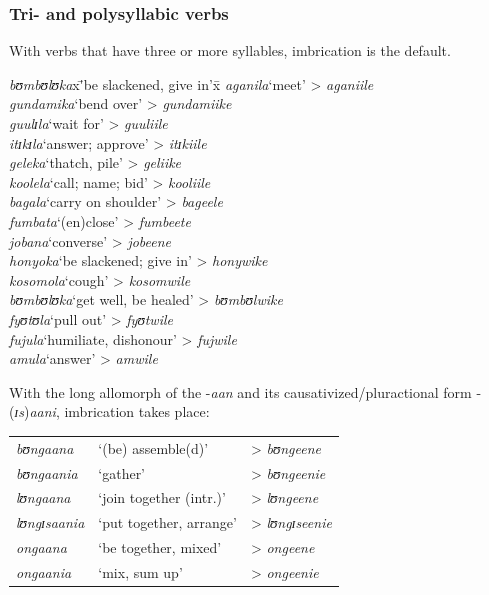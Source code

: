 \subsubsection{Tri- and polysyllabic verbs}
With verbs that have three or more syllables, imbrication is the default. %
\begin{exe}
\ex%
\begin{tabbing}
\textit{bʊmbʊlʊka}x\='be slackened, give in'x\=\kill%
\textit{aganila}\>`meet'\> > \textit{aganiile} \\
\textit{gundamika}\>`bend over'\> > \textit{gundamiike}\\
\textit{guulɪla}\>`wait for'\> > \textit{guuliile}\\
\textit{itɪkɪla}\>`answer; approve'\> > \textit{itɪkiile}\\ 
\textit{geleka}\>`thatch, pile'\> > \textit{geliike}\\
\textit{koolela}\>`call; name; bid'\> > \textit{kooliile} \\
\textit{bagala}\>`carry on shoulder'\> > \textit{bageele} \\
\textit{fumbata}\>`(en)close'\> > \textit{fumbeete}\\
\textit{jobana}\>`converse'\> > \textit{jobeene}\\
\textit{honyoka}\>`be slackened; give in'\> > \textit{honywike}\\
\textit{kosomola}\>`cough'\> > \textit{kosomwile}\\
\textit{bʊmbʊlʊka}\>`get well, be healed'\> > \textit{bʊmbʊlwike}\\
\textit{fyʊtʊla}\>`pull out'\> > \textit{fyʊtwile}\\
\textit{fujula}\>`humiliate, dishonour'\> > \textit{fujwile}\\
\textit{amula}\>`answer'\> > \textit{amwile}
\end{tabbing}
\end{exe}

With the long allomorph of the  -\textit{aan} and its causativized/plur\-action\-al form \mbox{-(\textit{ɪs})\textit{aani}}, imbrication takes place:

\begin{exe}
\ex
\begin{tabular}[t]{@{}>{\itshape}lll}
\textit{bʊngaana}&`(be) assemble(d)'& > \textit{bʊngeene}\\
\textit{bʊngaania}&`gather'& > \textit{bʊngeenie}\\
\textit{lʊngaana}&`join together (intr.)'& > \textit{lʊngeene}\\
\textit{lʊngɪsaania}&`put together, arrange'& > \textit{lʊngɪseenie}\\
\textit{ongaana}&`be together, mixed'& > \textit{ongeene}\\
\textit{ongaania}&`mix, sum up'& > \textit{ongeenie}
\end{tabular}
\end{exe}

